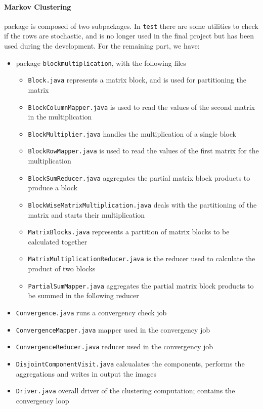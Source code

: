 \paragraph{Markov Clustering} package is composed of two subpackages. In \texttt{test} there are some utilities to check if the rows are stochastic, and is no longer used in the final project but has been used during the development.
For the remaining part, we have:
\begin{itemize}
\item package \texttt{blockmultiplication}, with the following files
\begin{itemize}
	\item \texttt{Block.java} represents a matrix block, and is used for partitioning the matrix
	\item \texttt{BlockColumnMapper.java} is used to read the values of the second matrix in the multiplication
	\item \texttt{BlockMultiplier.java} handles the multiplication of a single block
	\item \texttt{BlockRowMapper.java} is used to read the values of the first matrix for the multiplication
	\item \texttt{BlockSumReducer.java} aggregates the partial matrix block products to produce a block
	\item \texttt{BlockWiseMatrixMultiplication.java} deals with the partitioning of the matrix and starts their multiplication
	\item \texttt{MatrixBlocks.java} represents a partition of matrix blocks to be calculated together
	\item \texttt{MatrixMultiplicationReducer.java} is the reducer used to calculate the product of two blocks
	\item \texttt{PartialSumMapper.java} aggregates the partial matrix block products to be summed in the following reducer
\end{itemize}
\item \texttt{Convergence.java} runs a convergency check job
\item \texttt{ConvergenceMapper.java} mapper used in the convergency job
\item \texttt{ConvergenceReducer.java} reducer used in the convergency job
\item \texttt{DisjointComponentVisit.java} calcualates the components, performs the aggregations and writes in output the images
\item \texttt{Driver.java} overall driver of the clustering computation; contains the convergency loop

\end{itemize}
